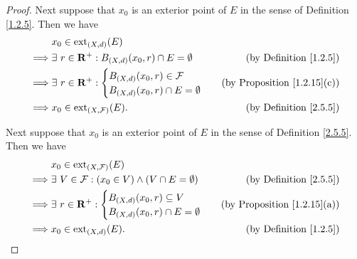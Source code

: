\begin{proof}
    Next suppose that \(x_0\) is an exterior point of \(E\) in the sense of Definition \ref{1.2.5}.
    Then we have
    \begin{align*}
                 & x_0 \in \text{ext}_{(X, d)}(E)                                                                                \\
        \implies & \exists\ r \in \mathbf{R}^+ : B_{(X, d)}(x_0, r) \cap E = \emptyset & \text{(by Definition \ref{1.2.5})}      \\
        \implies & \exists\ r \in \mathbf{R}^+ : \begin{cases}
            B_{(X, d)}(x_0, r) \in \mathcal{F} \\
            B_{(X, d)}(x_0, r) \cap E = \emptyset
        \end{cases}            & \text{(by Proposition \ref{1.2.15}(c))} \\
        \implies & x_0 \in \text{ext}_{(X, \mathcal{F})}(E).                           & \text{(by Definition \ref{2.5.5})}
    \end{align*}

    Next suppose that \(x_0\) is an exterior point of \(E\) in the sense of Definition \ref{2.5.5}.
    Then we have
    \begin{align*}
                 & x_0 \in \text{ext}_{(X, \mathcal{F})}(E)                                                                        \\
        \implies & \exists\ V \in \mathcal{F} : (x_0 \in V) \land (V \cap E = \emptyset) & \text{(by Definition \ref{2.5.5})}      \\
        \implies & \exists\ r \in \mathbf{R}^+ : \begin{cases}
            B_{(X, d)}(x_0, r) \subseteq V \\
            B_{(X, d)}(x_0, r) \cap E = \emptyset
        \end{cases}              & \text{(by Proposition \ref{1.2.15}(a))} \\
        \implies & x_0 \in \text{ext}_{(X, d)}(E).                                       & \text{(by Definition \ref{1.2.5})}
    \end{align*}


\end{proof}
